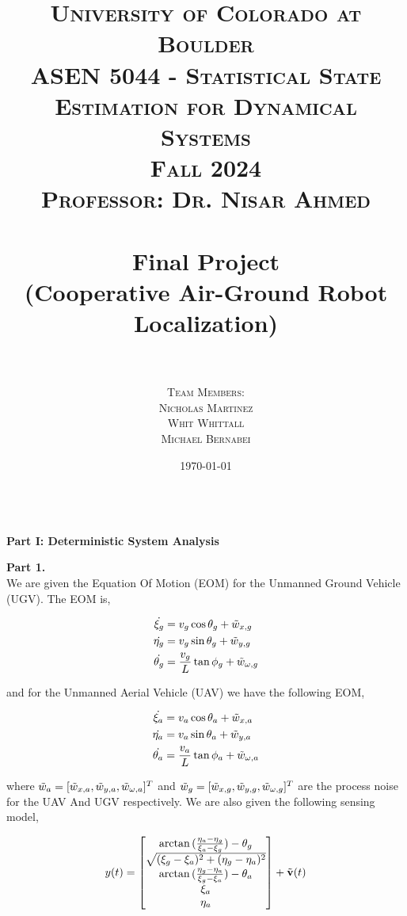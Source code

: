 \documentclass[paper=a4, fontsize=11pt]{scrartcl} %
\title{
\normalfont \LARGE
\textsc{University of Colorado at Boulder} \\ [25pt] %
\textsc{ASEN 5044 - Statistical State Estimation for Dynamical Systems} \\ [20pt]
\textsc{Fall 2024} \\ [20pt]
\textsc{Professor: Dr. Nisar Ahmed} \\ [12pt]
\horrule{1pt} \\[0.4cm] %
\huge Final Project \\ %
\huge (Cooperative Air-Ground Robot Localization) \\ 
\horrule{1pt} \\[0.6cm] %
}
\author{
  \textsc{ Team Members:} \\ [4 mm]
  \textsc{ Nicholas Martinez}\\[2mm]
  \textsc{ Whit Whittall } \\[2mm]
  \textsc{ Michael Bernabei}\\[2mm]
}
\date{\normalsize\today} %
\numberwithin{equation}{section} %
\numberwithin{figure}{section} %
\numberwithin{table}{section} %
\begin{document}
\maketitle %
\thispagestyle{empty} %
\newpage


%

\textbf{\\ Part I: Deterministic System Analysis }
\begin{framed}
\textbf{Part 1.} \\

We are given the Equation Of Motion (EOM) for the Unmanned Ground Vehicle (UGV).  The EOM is,

\begin{align*}
    \dot{\xi_g} &= v_g \cos{\theta_g} + \Tilde{w}_{x,g} \\
    \dot{\eta_g} &= v_g \sin{\theta_g} + \Tilde{w}_{y,g} \\
    \dot{\theta_g} &= \frac{v_g}{L}\tan{\phi_g}  + \Tilde{w}_{\omega,g} \\
\end{align*}

and for the Unmanned Aerial Vehicle (UAV) we have the following EOM,

\begin{align*}
    \dot{\xi_a} &= v_a \cos{\theta_a} + \Tilde{w}_{x,a} \\
    \dot{\eta_a} &= v_a \sin{\theta_a} + \Tilde{w}_{y,a} \\
    \dot{\theta_a} &= \frac{v_a}{L}\tan{\phi_a}  + \Tilde{w}_{\omega,a} \\
\end{align*}

where $\Tilde{w}_a = [ \Tilde{w}_{x,a},  \Tilde{w}_{y,a},  \Tilde{w}_{\omega,a}]^T$ and $\Tilde{w}_g = [ \Tilde{w}_{x,g},  \Tilde{w}_{y,g},  \Tilde{w}_{\omega,g}]^T$ are the process noise for the UAV And UGV respectively.  We are also given the following sensing model,

\begin{align*}
y(t) &=  
\begin{bmatrix} \arctan{(\frac{\eta_a - \eta_g}{\xi_a - \xi_g}}) - \theta_g   \\ 
                \sqrt{  (\xi_g - \xi_a)^2 + (\eta_g - \eta_a)^2}  \\
                \arctan{(\frac{\eta_g - \eta_a}{\xi_g - \xi_a})} - \theta_a \\
                \xi_a \\
                \eta_a
\end{bmatrix}  + \Tilde{\bold{v}}(t) \\
\end{align*}


\end{framed}
\end{document}
